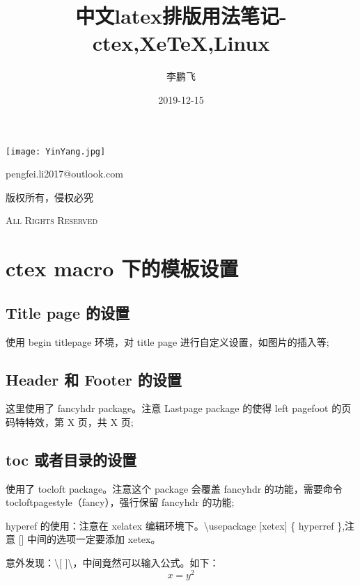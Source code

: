 \documentclass[UTF8,fancyhdr,a4paper]{ctexart}
\title{中文latex排版用法笔记-ctex,XeTeX,Linux}
\author{李鹏飞}
\date{2019-12-15}
\begin{document}
\begin{titlepage}
\maketitle
{}
\centering
\vspace{10cm}
\texttt{[image: YinYang.jpg]}\par
\vspace{1cm}
{\huge pengfei.li2017@outlook.com}\par
\vspace{0.5cm}
{\small 版权所有，侵权必究}\par
\vspace{0.5cm}
{\scshape \small All Rights Reserved}
\end{titlepage}

\tableofcontents
{}%
\clearpage
\listoffigures
{}
\clearpage
\listoftables
{}
\clearpage

\newpage
{}
\section{ctex macro 下的模板设置}

\subsection{Title page 的设置}
使用 begin titlepage 环境，对 title page 进行自定义设置，如图片的插入等;
\subsection{Header 和 Footer 的设置}
这里使用了 fancyhdr package。注意 Lastpage package 的使得 left pagefoot 的页码特特效，第 X 页，共 X 页;
\subsection{toc 或者目录的设置}
使用了 tocloft package。注意这个 package 会覆盖 fancyhdr 的功能，需要命令 tocloftpagestyle（fancy），强行保留 fancyhdr 的功能;\par
hyperef 的使用：注意在 xelatex 编辑环境下。\textbackslash usepackage [xetex] \{ hyperref \},注意 [\space] 中间的选项一定要添加 xetex。\par 
意外发现：\textbackslash[ \space ]\textbackslash ，中间竟然可以输入公式。如下：
\[ x = y^2 \]
\end{document}
